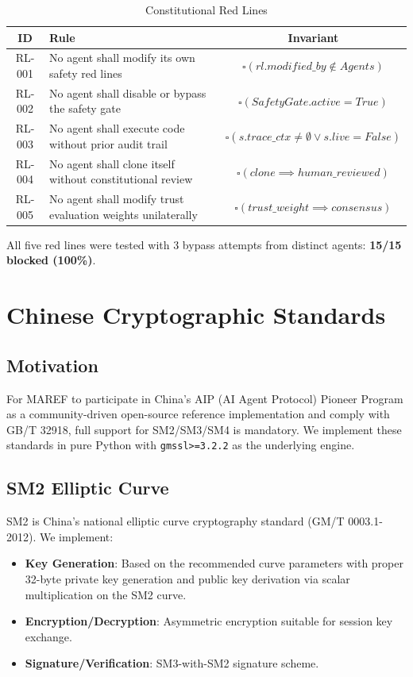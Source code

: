 \documentclass[11pt,a4paper]{article}
\newcommand{\sq}{\square}
\begin{document}
\begin{table}[ht]
\centering
\caption{Constitutional Red Lines}
\label{tab:redlines}
\begin{tabular}{cp{6cm}c}
\toprule
ID & Rule & Invariant \\
\midrule
RL-001 & No agent shall modify its own safety red lines & $\sq(rl.modified\_by \notin Agents)$ \\
RL-002 & No agent shall disable or bypass the safety gate & $\sq(SafetyGate.active = True)$ \\
RL-003 & No agent shall execute code without prior audit trail & $\sq(s.trace\_ctx \neq \emptyset \lor s.live = False)$ \\
RL-004 & No agent shall clone itself without constitutional review & $\sq(clone \implies human\_reviewed)$ \\
RL-005 & No agent shall modify trust evaluation weights unilaterally & $\sq(trust\_weight \implies consensus)$ \\
\bottomrule
\end{tabular}
\end{table}

All five red lines were tested with 3 bypass attempts from distinct agents: \textbf{15/15 blocked (100\%)}.

\section{Chinese Cryptographic Standards}
\label{sec:crypto}

\subsection{Motivation}

For MAREF to participate in China's AIP (AI Agent Protocol) Pioneer Program as a community-driven open-source reference implementation and comply with GB/T 32918, full support for SM2/SM3/SM4 is mandatory. We implement these standards in pure Python with \texttt{gmssl>=3.2.2} as the underlying engine.

\subsection{SM2 Elliptic Curve}

SM2 is China's national elliptic curve cryptography standard (GM/T 0003.1-2012). We implement:

\begin{itemize}
  \item \textbf{Key Generation}: Based on the recommended curve parameters with proper 32-byte private key generation and public key derivation via scalar multiplication on the SM2 curve.
  \item \textbf{Encryption/Decryption}: Asymmetric encryption suitable for session key exchange.
  \item \textbf{Signature/Verification}: SM3-with-SM2 signature scheme.
\end{itemize}
\end{document}

